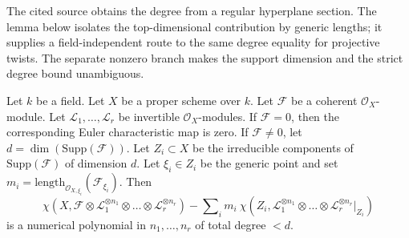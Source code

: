 \begin{lemma}
\label{lemma-numerical-polynomial-leading-term}
\begin{reference}
\cite[Chapter III, \S 6, no. 81, Proposition 6 and proof,
pp. 276--277]{FAC}
\end{reference}
\begin{history}
The cited source obtains the degree from a regular hyperplane section. The
lemma below isolates the top-dimensional contribution by generic lengths;
it supplies a field-independent route to the same degree equality for
projective twists. The separate nonzero branch makes the support dimension and
the strict degree bound unambiguous.
\end{history}
Let $k$ be a field. Let $X$ be a proper scheme over $k$. Let
$\mathcal{F}$ be a coherent $\mathcal{O}_X$-module. Let
$\mathcal{L}_1, \ldots, \mathcal{L}_r$ be invertible $\mathcal{O}_X$-modules.
If $\mathcal{F} = 0$, then the corresponding Euler characteristic map is
zero. If $\mathcal{F} \not = 0$, let
$d = \dim(\text{Supp}(\mathcal{F}))$.
Let $Z_i \subset X$ be the irreducible components
of $\text{Supp}(\mathcal{F})$ of dimension $d$. Let $\xi_i \in Z_i$
be the generic point and set
$m_i = \text{length}_{\mathcal{O}_{X, \xi_i}}(\mathcal{F}_{\xi_i})$.
Then
$$
\chi(X, \mathcal{F} \otimes \mathcal{L}_1^{\otimes n_1} \otimes \ldots \otimes
\mathcal{L}_r^{\otimes n_r}) -
\sum\nolimits_i
m_i\ \chi(Z_i, \mathcal{L}_1^{\otimes n_1} \otimes \ldots \otimes
\mathcal{L}_r^{\otimes n_r}|_{Z_i})
$$
is a numerical polynomial in $n_1, \ldots, n_r$ of total degree $< d$.
\end{lemma}

